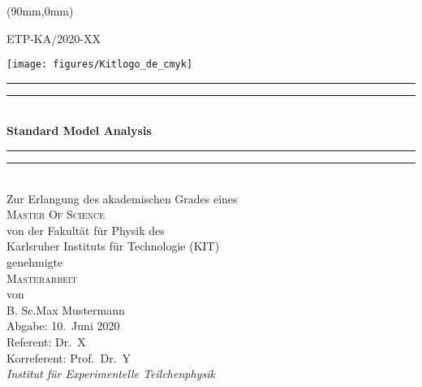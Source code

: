 \begin{titlepage}
    \begin{center}
        \begin{textblock*}{5cm}(90mm,0mm)
            \begin{flushright}
                \small
                ETP-KA/2020-XX
            \end{flushright}
        \end{textblock*}
        \texttt{[image: figures/Kitlogo\_de\_cmyk]}
        \vspace*{2cm}

        \vspace*{\baselineskip}
        \rule{\textwidth}{1.6pt}\vspace*{-\baselineskip}\vspace*{2pt}
        \rule{\textwidth}{0.4pt}\\[\baselineskip]
        \LARGE{\textbf{Standard Model \Htt Analysis}}\\
        \rule{\textwidth}{0.4pt}\vspace*{-\baselineskip}\vspace{3.2pt}
        \rule{\textwidth}{1.6pt}\\[\baselineskip]
        \vspace{6ex}
        \large Zur Erlangung des akademischen Grades eines\\[2.5ex]
        \textsc{Master Of Science}\\[2.5ex]
            von der Fakultät für Physik des\\
        Karlsruher Instituts für Technologie (KIT)\\ 
        genehmigte\\
        \vspace{2.5ex}
        \textsc{Masterarbeit}\\
        \vspace{2.5ex}
        von\\
        \vspace{2ex}
        B. Sc.\;Max Mustermann\\

\vspace{\fill}
Abgabe: 10.\ Juni 2020\\[1.5ex]
Referent: Dr.\ X\\[0.5ex]
Korreferent: Prof.\ Dr.\  Y\\
\emph{Institut für Experimentelle Teilchenphysik}
    \end{center}
\end{titlepage}
\cleardoublepage
